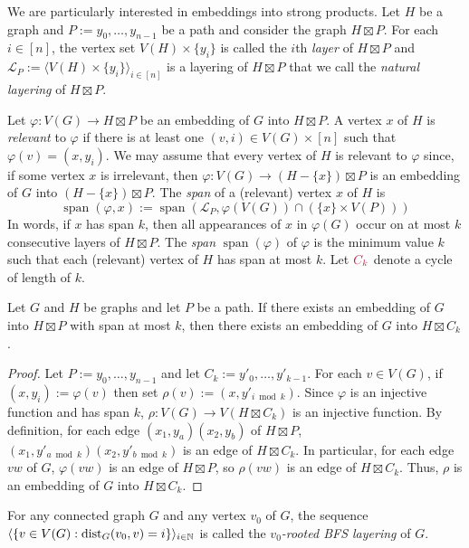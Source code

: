 \documentclass{patmorin}
\makeatletter
\newcommand{\defin}[1]{\emph{\textcolor{brightmaroon}{#1}}}
\def\mathcolor#1#{\@mathcolor{#1}}
\def\@mathcolor#1#2#3{%
  \protect\leavevmode
  \begingroup
    \color#1{#2}#3%
  \endgroup
}
\newcommand{\mathdefin}[1]{\mathcolor{brightmaroon}{#1}}
\DeclareMathOperator{\spn}{span}
\DeclareMathOperator{\dist}{dist}
\makeatother
\begin{document}
We are particularly interested in embeddings into strong products.  Let $H$ be a graph and $P:=y_0,\ldots,y_{n-1}$ be a path and consider the graph $H\boxtimes P$.  For each $i\in[n]$, the vertex set $V(H)\times\{y_i\}$ is called the $i$th \defin{layer} of $H\boxtimes P$ and $\mathcal{L}_P:=\langle V(H)\times\{y_i\} \rangle_{i\in[n]}$ is a layering of $H\boxtimes P$ that we call the \defin{natural layering} of $H\boxtimes P$.

Let $\varphi:V(G)\to H\boxtimes P$ be an embedding of $G$ into $H\boxtimes P$. A vertex $x$ of $H$ is \defin{relevant} to $\varphi$ if there is at least one $(v,i)\in V(G)\times [n]$ such that $\varphi(v)=(x,y_i)$.  We may assume that every vertex of $H$ is relevant to $\varphi$ since, if some vertex $x$ is irrelevant, then $\varphi:V(G)\to (H-\{x\})\boxtimes P$ is an embedding of $G$ into $(H-\{x\})\boxtimes P$. The \defin{span} of a (relevant) vertex $x$ of $H$ is
\[
  \spn(\varphi,x):=\spn(\mathcal{L}_P, \varphi(V(G))\cap (\{x\}\times V(P)))
\]
In words, if $x$ has span $k$, then all appearances of $x$ in $\varphi(G)$ occur on at most $k$ consecutive layers of $H\boxtimes P$.  The \defin{span} $\spn(\varphi)$ of $\varphi$ is the minimum value $k$ such that each (relevant) vertex of $H$ has span at most $k$.  Let $\mathdefin{C_k}$ denote a cycle of length of $k$.

\begin{lem}
  Let $G$ and $H$ be graphs and let $P$ be a path.  If there exists an embedding of $G$ into $H\boxtimes P$ with span at most $k$, then there exists an embedding of $G$ into $H\boxtimes C_k$.
\end{lem}

\begin{proof}
  Let $P:=y_0,\ldots,y_{n-1}$ and let $C_k:=y'_0,\ldots,y'_{k-1}$.  For each $v\in V(G)$, if $(x,y_i):=\varphi(v)$ then set $\rho(v):=(x,y'_{i\bmod k})$.  Since $\varphi$ is an injective function and has span $k$, $\rho:V(G)\to V(H\boxtimes C_k)$ is an injective function. By definition, for each edge $(x_1,y_{a})(x_2,y_b)$ of $H\boxtimes P$,  $(x_1,y'_{a\bmod k})(x_2,y'_{b\bmod k})$ is an edge of $H\boxtimes C_k$.  In particular, for each edge $vw$ of $G$, $\varphi(vw)$ is an edge of $H\boxtimes P$, so $\rho(vw)$ is an edge of $H\boxtimes C_k$.  Thus, $\rho$ is an embedding of $G$ into $H\boxtimes C_k$.
\end{proof}

For any connected graph $G$ and any vertex $v_0$ of $G$, the sequence $\langle \{v\in V(G):\dist_G(v_0,v)=i\}\rangle_{i\in\N}$ is called the \defin{$v_0$-rooted BFS layering} of $G$.
\end{document}
